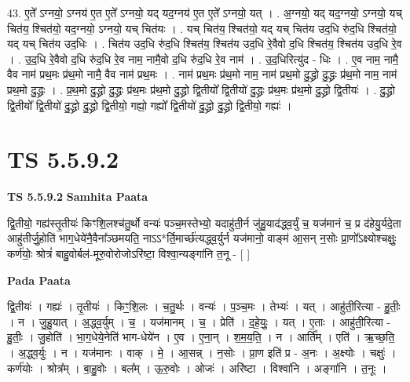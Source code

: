 \documentclass[17pt]{extarticle}
\begin{document}
43. ए॒ते᳚ ऽग्नयो॒ ऽग्नय॑ ए॒त ए॒ते᳚ ऽग्नयो॒ यद् यद॒ग्नय॑ ए॒त ए॒ते᳚ ऽग्नयो॒ यत् । . अ॒ग्नयो॒ यद् यद॒ग्नयो॒ ऽग्नयो॒ यच् चित॑य॒ श्चित॑यो॒ यद॒ग्नयो॒ ऽग्नयो॒ यच् चित॑यः । . यच् चित॑य॒ श्चित॑यो॒ यद् यच् चित॑य उद॒धि रु॑द॒धि श्चित॑यो॒ यद् यच् चित॑य उद॒धिः । . चित॑य उद॒धि रु॑द॒धि श्चित॑य॒ श्चित॑य उद॒धि रे॒वैवो द॒धि श्चित॑य॒ श्चित॑य उद॒धि रे॒व । . उ॒द॒धि रे॒वैवो द॒धि रु॑द॒धि रे॒व नाम॒ नामै॒वो द॒धि रु॑द॒धि रे॒व नाम॑ । . उ॒द॒धिरित्यु॑द - धिः । . ए॒व नाम॒ नामै॒ वैव नाम॑ प्रथ॒मः प्र॑थ॒मो नामै॒ वैव नाम॑ प्रथ॒मः । . नाम॑ प्रथ॒मः प्र॑थ॒मो नाम॒ नाम॑ प्रथ॒मो दु॒द्ध्रो दु॒द्ध्रः प्र॑थ॒मो नाम॒ नाम॑ प्रथ॒मो दु॒द्ध्रः । . प्र॒थ॒मो दु॒द्ध्रो दु॒द्ध्रः प्र॑थ॒मः प्र॑थ॒मो दु॒द्ध्रो द्वि॒तीयो᳚ द्वि॒तीयो॑ दु॒द्ध्रः प्र॑थ॒मः प्र॑थ॒मो दु॒द्ध्रो द्वि॒तीयः॑ । . दु॒द्ध्रो द्वि॒तीयो᳚ द्वि॒तीयो॑ दु॒द्ध्रो दु॒द्ध्रो द्वि॒तीयो॒ गह्यो॒ गह्यो᳚ द्वि॒तीयो॑ दु॒द्ध्रो दु॒द्ध्रो द्वि॒तीयो॒ गह्यः॑ । \newline
\pagebreak
{}

\section{ TS 5.5.9.2 }

\textbf{TS 5.5.9.2 } \newline
\textbf{Samhita Paata} \newline

द्वि॒तीयो॒ गह्य॑स्तृ॒तीयः॑ किꣳशि॒लश्च॑तु॒र्थो वन्यः॑ पञ्च॒मस्तेभ्यो॒ यदाहु॑ती॒र्न जु॑हु॒याद॑द्ध्व॒र्युं च॒ यज॑मानं च॒ प्र द॑हेयु॒र्यदे॒ता आहु॑तीर्जु॒होति॑ भाग॒धेये॑नै॒वैना᳚ञ्छमयति॒ नाऽऽ*र्ति॒मार्च्छ॑त्यद्ध्व॒र्युर्न यज॑मानो॒ वाङ्म॑ आ॒सन् न॒सोः प्रा॒णो᳚ऽक्ष्योश्चक्षुः॒ कर्ण॑योः॒ श्रोत्रं॑ बाहु॒वोर्बल॑-मूरु॒वोरोजोऽरि॑ष्टा॒ विश्वा॒न्यङ्गा॑नि त॒नू - [  ] \newline

\textbf{Pada Paata} \newline

द्वि॒तीयः॑ । गह्यः॑ । तृ॒तीयः॑ । किꣳ॒॒शि॒लः । च॒तु॒र्थः । वन्यः॑ । प॒ञ्च॒मः । तेभ्यः॑ । यत् । आहु॑ती॒रित्या - हु॒तीः॒ । न । जु॒हु॒यात् । अ॒द्ध्व॒र्युम् । च॒ । यज॑मानम् । च॒ । प्रेति॑ । द॒हे॒युः॒ । यत् । ए॒ताः । आहु॑ती॒रित्या - हु॒तीः॒ । जु॒होति॑ । भा॒ग॒धेये॒नेति॑ भाग-धेये॑न । ए॒व । ए॒ना॒न् । श॒म॒य॒ति॒ । न । आर्ति᳚म् । एति॑ । ऋ॒च्छ॒ति॒ । अ॒द्ध्व॒र्युः । न । यज॑मानः । वाक् । मे॒ । आ॒सन्न् । न॒सोः । प्रा॒ण इति॑ प्र - अ॒नः । अ॒क्ष्योः । चक्षुः॑ । कर्ण॑योः । श्रोत्र᳚म् । बा॒हु॒वोः । बल᳚म् । ऊ॒रु॒वोः । ओजः॑ । अरि॑ष्टा । विश्वा॑नि । अङ्गा॑नि । त॒नूः ।  \newline
\end{document}

